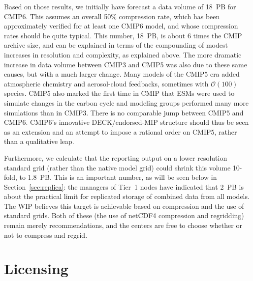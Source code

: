 \documentclass[gmd,manuscript]{copernicus}
\newcommand{\secref}[1] {\mbox{Section  \ref{sec:#1}}}
\begin{document}
Based on those results, we initially have forecast a data volume of
18~PB for CMIP6. This assumes an overall 50\% compression rate, which
has been approximately verified for at least one CMIP6 model, and
whose compression rates should be quite typical. This number, 18~PB,
is about 6 times the CMIP archive size, and can be explained in terms
of the compounding of modest increases in resolution and complexity,
as explained above. The more dramatic increase in data volume between
CMIP3 and CMIP5 was also due to these same causes, but with a much
larger change. Many models of the CMIP5 era added atmospheric chemistry
and aerosol-cloud feedbacks, sometimes with $\mathcal{O}(100)$
species. CMIP5 also marked the first time in CMIP that ESMs were used to
simulate changes in the carbon cycle and modeling groups performed
many more simulations than in CMIP3. There is no comparable jump 
between CMIP5 and CMIP6. CMIP6's innovative DECK/endorsed-MIP structure 
should thus be seen as an extension and an attempt to impose a rational 
order on CMIP5, rather than a qualitative leap.

Furthermore, we calculate that the reporting output on a lower
resolution standard grid (rather than the native model grid) could
shrink this volume 10-fold, to 1.8~PB. This is an important number, as
will be seen below in \secref{replica}: the managers of Tier~1 nodes
have indicated that 2~PB is about the practical limit for replicated
storage of combined data from all models. The WIP believes
this target is achievable based on compression and the use of standard
grids. Both of these (the use of netCDF4 compression and regridding)
remain merely recommendations, and the centers are free to choose
whether or not to compress and regrid.

\section{Licensing}
\label{sec:licensing}
\end{document}
